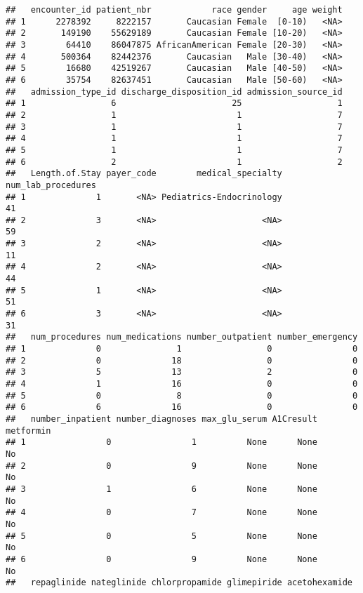 \documentclass[
]{article}
\begin{document}
\begin{verbatim}
##   encounter_id patient_nbr            race gender     age weight
## 1      2278392     8222157       Caucasian Female  [0-10)   <NA>
## 2       149190    55629189       Caucasian Female [10-20)   <NA>
## 3        64410    86047875 AfricanAmerican Female [20-30)   <NA>
## 4       500364    82442376       Caucasian   Male [30-40)   <NA>
## 5        16680    42519267       Caucasian   Male [40-50)   <NA>
## 6        35754    82637451       Caucasian   Male [50-60)   <NA>
##   admission_type_id discharge_disposition_id admission_source_id
## 1                 6                       25                   1
## 2                 1                        1                   7
## 3                 1                        1                   7
## 4                 1                        1                   7
## 5                 1                        1                   7
## 6                 2                        1                   2
##   Length.of.Stay payer_code        medical_specialty num_lab_procedures
## 1              1       <NA> Pediatrics-Endocrinology                 41
## 2              3       <NA>                     <NA>                 59
## 3              2       <NA>                     <NA>                 11
## 4              2       <NA>                     <NA>                 44
## 5              1       <NA>                     <NA>                 51
## 6              3       <NA>                     <NA>                 31
##   num_procedures num_medications number_outpatient number_emergency
## 1              0               1                 0                0
## 2              0              18                 0                0
## 3              5              13                 2                0
## 4              1              16                 0                0
## 5              0               8                 0                0
## 6              6              16                 0                0
##   number_inpatient number_diagnoses max_glu_serum A1Cresult metformin
## 1                0                1          None      None        No
## 2                0                9          None      None        No
## 3                1                6          None      None        No
## 4                0                7          None      None        No
## 5                0                5          None      None        No
## 6                0                9          None      None        No
##   repaglinide nateglinide chlorpropamide glimepiride acetohexamide

\end{verbatim}
\end{document}
